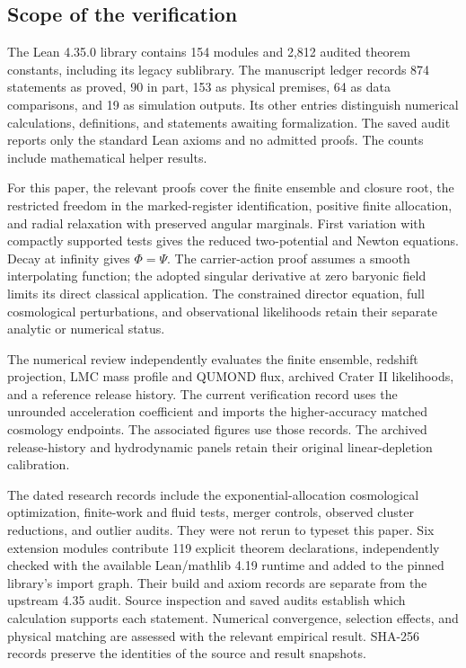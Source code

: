 \subsection{Scope of the verification}

The Lean 4.35.0 library contains 154 modules and 2,812 audited theorem
constants, including its legacy sublibrary. The manuscript ledger records
874 statements as proved, 90 in part, 153 as physical premises, 64 as
data comparisons, and 19 as simulation outputs. Its other entries
distinguish numerical calculations, definitions, and statements awaiting
formalization. The saved audit reports only the standard Lean axioms
and no admitted proofs. The counts include mathematical helper results.

For this paper, the relevant proofs cover the finite ensemble and closure
root, the restricted freedom in the marked-register identification,
positive finite allocation, and radial relaxation with preserved angular
marginals. First variation with compactly supported tests gives the
reduced two-potential and Newton equations. Decay at infinity gives
$\Phi=\Psi$. The carrier-action proof assumes a smooth interpolating
function; the adopted singular derivative at zero baryonic field limits
its direct classical application. The constrained director equation,
full cosmological perturbations, and observational likelihoods retain
their separate analytic or numerical status.

The numerical review independently evaluates the finite ensemble,
redshift projection, LMC mass profile and QUMOND flux, archived Crater II
likelihoods, and a reference release history. The current verification
record uses the unrounded acceleration coefficient and imports the
higher-accuracy matched cosmology endpoints. The associated figures
use those records. The archived release-history and hydrodynamic panels
retain their original linear-depletion calibration.

The dated research records include the exponential-allocation cosmological
optimization, finite-work and fluid tests, merger controls, observed cluster
reductions, and outlier audits. They were not rerun to typeset this paper.
Six extension modules contribute 119 explicit theorem declarations,
independently checked with the available Lean/mathlib 4.19 runtime and
added to the pinned library's import graph. Their build and axiom records
are separate from the upstream 4.35 audit.  Source inspection and saved
audits establish which calculation supports each statement. Numerical
convergence, selection effects, and physical matching are assessed with
the relevant empirical result. SHA-256 records preserve the identities
of the source and result snapshots.

